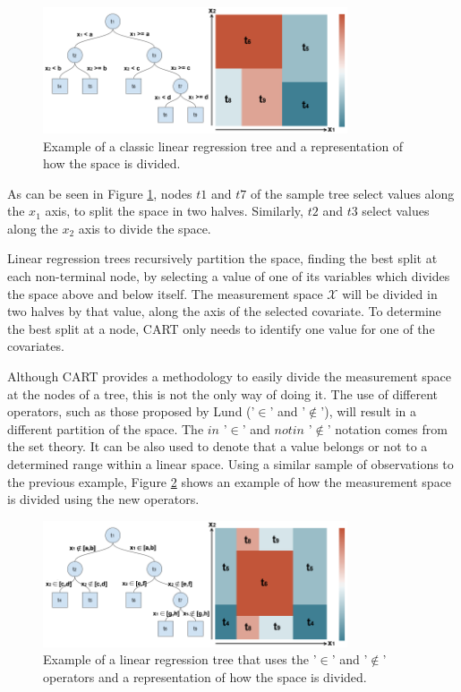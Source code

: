 \documentclass[times,twocolumn,final,authoryear]{elsarticle}
\begin{document}
\begin{figure}
  \includegraphics[width=9cm]{fig1_master.png}
\caption{Example of a classic linear regression tree and a representation of how the space is divided. }
\label{f1}       %
\end{figure}
%
 
As can be seen in Figure \ref{f1}, nodes $t1$ and $t7$ of the sample tree select values along the $x_1$ axis, to split the space in two halves. Similarly, $t2$ and $t3$ select values along the $x_2$ axis to divide the space.

Linear regression trees recursively partition the space, finding the best split at each non-terminal node, by selecting a value of one of its variables which divides the space above and below itself. The measurement space $\mathcal{X}$ will be divided in two halves by that value, along the axis of the selected covariate. To determine the best split at a node, CART only needs to identify one value for one of the covariates.

Although CART provides a methodology to easily divide the measurement space at the nodes of a tree, this is not the only way of doing it. The use of different operators, such as those proposed by Lund ('$\in$' and '$\notin$'), will result in a different partition of the space. The $in$ '$\in$' and $not in$ '$\notin$' notation comes from the set theory. It can be also used to denote that a value belongs or not to a determined range within a linear space. Using a similar sample of observations to the previous example, Figure \ref{f2} shows an example of how the measurement space is divided using the new operators.

%
\begin{figure}
  \includegraphics[width=9cm]{fig2_master.png}
\caption{Example of a linear regression tree that uses the '$\in$' and '$\notin$' operators and a representation of how the space is divided.}
\label{f2}       %
\end{figure}
%
\end{document}
